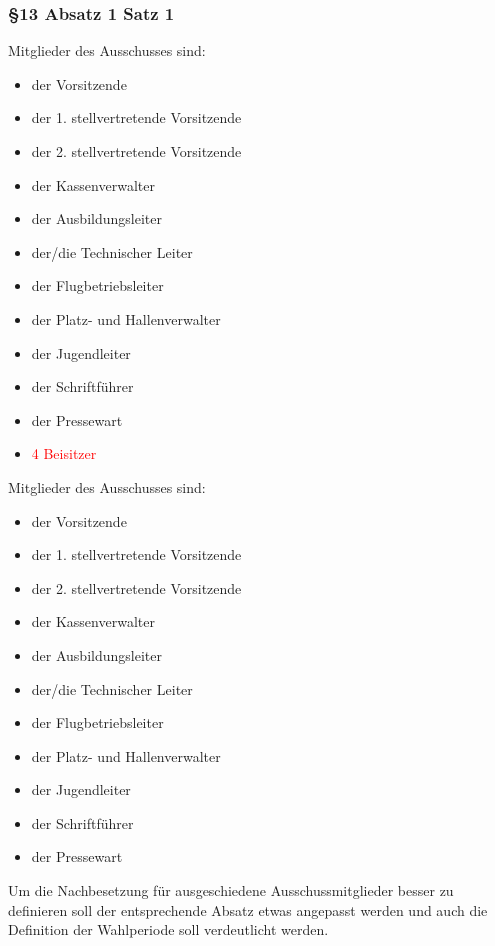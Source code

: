 \documentclass[10pt,a4paper,parskip=half]{scrartcl}
\newcommand{\old}[1]{\textcolor{Red}{#1}}
\newcommand{\change}[1]{
  \begin{adjustwidth}{20pt}{20pt}
    #1
  \end{adjustwidth}
}
\begin{document}
  \change{
  \subsubsection*{§13 Absatz 1 Satz 1}
  \begin{multicols}{2}
  Mitglieder des Ausschusses sind:
    \begin{itemize}[noitemsep]
      \item der Vorsitzende
      \item der 1. stellvertretende Vorsitzende
      \item der 2. stellvertretende Vorsitzende
      \item der Kassenverwalter
      \item der Ausbildungsleiter
      \item der/die Technischer Leiter
      \item der Flugbetriebsleiter
      \item der Platz- und Hallenverwalter
      \item der Jugendleiter
      \item der Schriftführer
      \item der Pressewart
      \item \old{4 Beisitzer}
    \end{itemize}
  \columnbreak
  Mitglieder des Ausschusses sind:
    \begin{itemize}[noitemsep]
      \item der Vorsitzende
      \item der 1. stellvertretende Vorsitzende
      \item der 2. stellvertretende Vorsitzende
      \item der Kassenverwalter
      \item der Ausbildungsleiter
      \item der/die Technischer Leiter
      \item der Flugbetriebsleiter
      \item der Platz- und Hallenverwalter
      \item der Jugendleiter
      \item der Schriftführer
      \item der Pressewart
    \end{itemize}
  \end{multicols}
  }

  Um die Nachbesetzung für ausgeschiedene Ausschussmitglieder besser zu definieren soll der entsprechende Absatz etwas angepasst werden und auch die Definition der Wahlperiode soll verdeutlicht werden.
\end{document}
